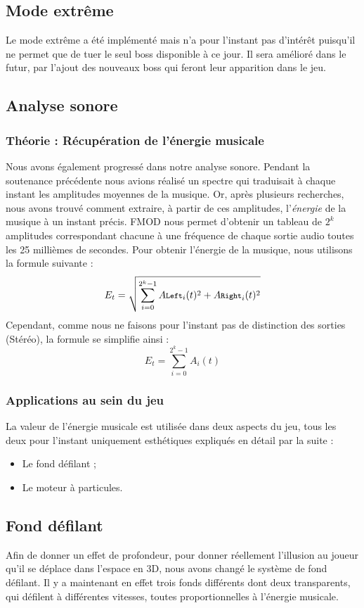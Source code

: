 \documentclass[12pt,a4paper]{article}
\begin{document}
		\newpage
		\subsection{Mode extrême}
		Le mode extrême a été implémenté mais n'a pour l'instant pas d'intérêt puisqu'il ne permet que de tuer le seul boss disponible à ce jour.
		Il sera amélioré dans le futur, par l'ajout des nouveaux boss qui feront leur apparition dans le jeu.
	
		\subsection{Analyse sonore}
		\subsubsection{Théorie : Récupération de l'énergie musicale}
		Nous avons également progressé dans notre analyse sonore. Pendant la soutenance précédente nous avions réalisé un spectre qui traduisait à chaque instant les amplitudes moyennes de la musique. Or, après plusieurs recherches, nous avons trouvé comment extraire, à partir de ces amplitudes, l'\emph{énergie} de la musique à un instant précis.
		FMOD nous permet d'obtenir un tableau de $2^k$ amplitudes correspondant chacune à une fréquence de chaque sortie audio toutes les 25 millièmes de secondes. Pour obtenir l'énergie de la musique, nous utilisons la formule suivante :
		$$E_t = \sqrt{\sum_{i=0}^{2^k - 1} A\footnotesize{\texttt{Left}}_i(t)^2 + A\footnotesize{\texttt{Right}}_i(t)^2}$$
		Cependant, comme nous ne faisons pour l'instant pas de distinction des sorties (Stéréo), la formule se simplifie ainsi :
		$$E_t = \sum_{i=0}^{2^k - 1} A_i(t)$$
		\subsubsection{Applications au sein du jeu}
		La valeur de l'énergie musicale est utilisée dans deux aspects du jeu, tous les deux pour l'instant uniquement esthétiques expliqués en détail par la suite :
		\begin{itemize}
		\item Le fond défilant ;
		\item Le moteur à particules.
		\end{itemize}
		
		\subsection{Fond défilant}		
		Afin de donner un effet de profondeur, pour donner réellement l'illusion au joueur qu'il se déplace dans l'espace en 3D, nous avons changé le système de fond défilant. Il y a maintenant en effet trois fonds différents dont deux transparents, qui défilent à différentes vitesses, toutes proportionnelles à l'énergie musicale.
\end{document}
